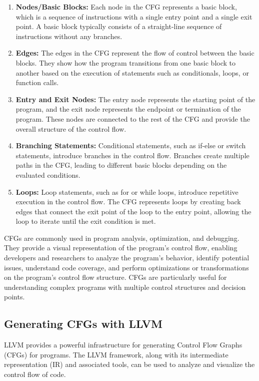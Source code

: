 \begin{enumerate}
    \item \textbf{Nodes/Basic Blocks:} Each node in the CFG represents a basic block, which is a sequence of instructions with a single entry point and a single exit point. A basic block typically consists of a straight-line sequence of instructions without any branches.
    \item \textbf{Edges:} The edges in the CFG represent the flow of control between the basic blocks. They show how the program transitions from one basic block to another based on the execution of statements such as conditionals, loops, or function calls.
    \item \textbf{Entry and Exit Nodes:} The entry node represents the starting point of the program, and the exit node represents the endpoint or termination of the program. These nodes are connected to the rest of the CFG and provide the overall structure of the control flow.
    \item \textbf{Branching Statements:} Conditional statements, such as if-else or switch statements, introduce branches in the control flow. Branches create multiple paths in the CFG, leading to different basic blocks depending on the evaluated conditions.
    \item \textbf{Loops:} Loop statements, such as for or while loops, introduce repetitive execution in the control flow. The CFG represents loops by creating back edges that connect the exit point of the loop to the entry point, allowing the loop to iterate until the exit condition is met.
\end{enumerate}

CFGs are commonly used in program analysis, optimization, and debugging. They provide a visual representation of the program's control flow, enabling developers and researchers to analyze the program's behavior, identify potential issues, understand code coverage, and perform optimizations or transformations on the program's control flow structure. CFGs are particularly useful for understanding complex programs with multiple control structures and decision points.

\subsection{Generating CFGs with LLVM}

LLVM provides a powerful infrastructure for generating Control Flow Graphs (CFGs) for programs. The LLVM framework, along with its intermediate representation (IR) and associated tools, can be used to analyze and visualize the control flow of code.

